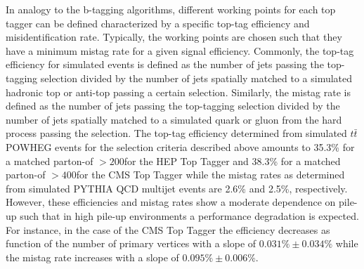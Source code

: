 In analogy to the b-tagging algorithms, different working points for each top tagger can be defined characterized by a specific top-tag efficiency and misidentification rate. Typically, the working points are chosen such that they have a minimum mistag rate for a given signal efficiency. Commonly, the top-tag efficiency for simulated events is defined as the number of jets passing the top-tagging selection divided by the number of jets spatially matched to a simulated hadronic top or anti-top passing a certain \pt selection. Similarly, the mistag rate is defined as the number of jets passing the top-tagging selection divided by the number of jets spatially matched to a simulated quark or gluon from the hard process passing the \pt selection. The top-tag efficiency determined from simulated $t\bar{t}$ POWHEG events for the selection criteria described above amounts to 35.3\% for a matched parton-\pt of $> 200$\gev for the HEP Top Tagger and 38.3\% for a matched parton-\pt of $> 400$\gev for the CMS Top Tagger while the mistag rates as determined from simulated PYTHIA QCD multijet events are 2.6\% and 2.5\%, respectively. However, these efficiencies and mistag rates show a moderate dependence on pile-up such that in high pile-up environments a performance degradation is expected. For instance, in the case of the CMS Top Tagger the efficiency decreases as function of the number of primary vertices with a slope of $0.031\% \pm 0.034\%$ while the mistag rate increases with a slope of $0.095\% \pm 0.006\%$.      


